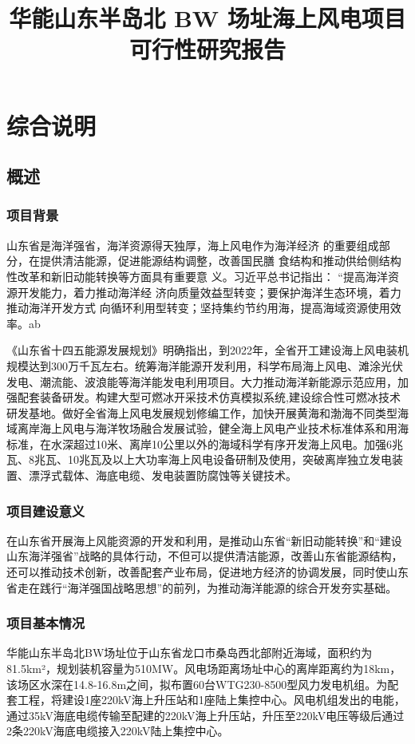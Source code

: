 \documentclass[12pt, letterpaper]{article}
\title{ \textbf{华能山东半岛北 BW 场址海上风电项目} \\
	可行性研究报告}
\begin{document}
	
	\maketitle
	
	\tableofcontents
	
	\section{综合说明}
	\subsection{概述}
	\subsubsection{项目背景}
	山东省是海洋强省，海洋资源得天独厚，海上风电作为海洋经济
	的重要组成部分，在提供清洁能源，促进能源结构调整，改善国民膳
	食结构和推动供给侧结构性改革和新旧动能转换等方面具有重要意
	义。习近平总书记指出： “提高海洋资源开发能力，着力推动海洋经
	济向质量效益型转变；要保护海洋生态环境，着力推动海洋开发方式
	向循环利用型转变；坚持集约节约用海，提高海域资源使用效率。ab
	
	
	《山东省十四五能源发展规划》明确指出，到2022年，全省开工建设海上风电装机规模达到300万千瓦左右。统筹海洋能源开发利用，科学布局海上风电、滩涂光伏发电、潮流能、波浪能等海洋能发电利用项目。大力推动海洋新能源示范应用，加强配套装备研发。构建大型可燃冰开采技术仿真模拟系统,建设综合性可燃冰技术研发基地。做好全省海上风电发展规划修编工作，加快开展黄海和渤海不同类型海域离岸海上风电与海洋牧场融合发展试验，健全海上风电产业技术标准体系和用海标准，在水深超过10米、离岸10公里以外的海域科学有序开发海上风电。加强6兆瓦、8兆瓦、10兆瓦及以上大功率海上风电设备研制及使用，突破离岸独立发电装置、漂浮式载体、海底电缆、发电装置防腐蚀等关键技术。
	
	\subsubsection{项目建设意义}
	在山东省开展海上风能资源的开发和利用，是推动山东省“新旧动能转换”和“建设山东海洋强省”战略的具体行动，不但可以提供清洁能源，改善山东省能源结构，还可以推动技术创新，改善配套产业布局，促进地方经济的协调发展，同时使山东省走在践行“海洋强国战略思想”的前列，为推动海洋能源的综合开发夯实基础。
	
	\subsubsection{项目基本情况}
	华能山东半岛北BW场址位于山东省龙口市桑岛西北部附近海域，面积约为81.5km²，规划装机容量为510MW。风电场距离场址中心的离岸距离约为18km，该场区水深在14.8-16.8m之间，拟布置60台WTG230-8500型风力发电机组。为配套工程，将建设1座220kV海上升压站和1座陆上集控中心。风电机组发出的电能，通过35kV海底电缆传输至配建的220kV海上升压站，升压至220kV电压等级后通过2条220kV海底电缆接入220kV陆上集控中心。
	
\end{document}
